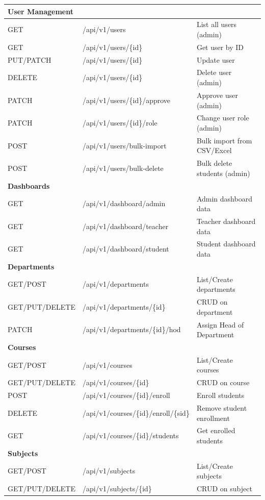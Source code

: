 \begin{longtable}{|l|p{5cm}|p{5.5cm}|}
\multicolumn{3}{|l|}{\textbf{User Management}} \\
\hline
GET & /api/v1/users & List all users (admin) \\
\hline
GET & /api/v1/users/\{id\} & Get user by ID \\
\hline
PUT/PATCH & /api/v1/users/\{id\} & Update user \\
\hline
DELETE & /api/v1/users/\{id\} & Delete user (admin) \\
\hline
PATCH & /api/v1/users/\{id\}/approve & Approve user (admin) \\
\hline
PATCH & /api/v1/users/\{id\}/role & Change user role (admin) \\
\hline
POST & /api/v1/users/bulk-import & Bulk import from CSV/Excel \\
\hline
POST & /api/v1/users/bulk-delete & Bulk delete students (admin) \\
\hline

\multicolumn{3}{|l|}{\textbf{Dashboards}} \\
\hline
GET & /api/v1/dashboard/admin & Admin dashboard data \\
\hline
GET & /api/v1/dashboard/teacher & Teacher dashboard data \\
\hline
GET & /api/v1/dashboard/student & Student dashboard data \\
\hline

\multicolumn{3}{|l|}{\textbf{Departments}} \\
\hline
GET/POST & /api/v1/departments & List/Create departments \\
\hline
GET/PUT/DELETE & /api/v1/departments/\{id\} & CRUD on department \\
\hline
PATCH & /api/v1/departments/\{id\}/hod & Assign Head of Department \\
\hline

\multicolumn{3}{|l|}{\textbf{Courses}} \\
\hline
GET/POST & /api/v1/courses & List/Create courses \\
\hline
GET/PUT/DELETE & /api/v1/courses/\{id\} & CRUD on course \\
\hline
POST & /api/v1/courses/\{id\}/enroll & Enroll students \\
\hline
DELETE & /api/v1/courses/\{id\}/enroll/\{sid\} & Remove student enrollment \\
\hline
GET & /api/v1/courses/\{id\}/students & Get enrolled students \\
\hline

\multicolumn{3}{|l|}{\textbf{Subjects}} \\
\hline
GET/POST & /api/v1/subjects & List/Create subjects \\
\hline
GET/PUT/DELETE & /api/v1/subjects/\{id\} & CRUD on subject \\
\hline


\end{longtable}
